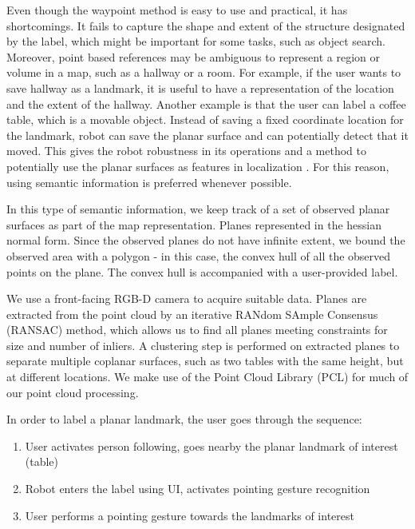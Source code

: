 Even though the waypoint method is easy to use and practical, it has shortcomings. It fails to capture the shape and extent of the structure designated by the label, which might be important for some tasks, such as object search. Moreover, point based references may be ambiguous to represent a region or volume in a map, such as a hallway or a room. For example, if the user wants to save hallway as a
landmark, it is useful to have a representation of the location
and the extent of the hallway. Another example is that the
user can label a coffee table, which is a movable object.
Instead of saving a fixed coordinate location for the landmark,
robot can save the planar surface and can potentially
detect that it moved. This gives the robot robustness in its operations and a method to potentially use the planar surfaces as features in localization \cite{trevor2012planar}. For this reason, using semantic information is preferred whenever possible.

In this type of semantic information, we keep track of a set of observed planar surfaces as part of the map representation. Planes represented in the hessian normal form. Since the observed planes do not have infinite extent, we bound the observed area with a polygon - in this case, the convex hull of all the observed points on the plane. The convex hull is accompanied with a user-provided label. 

We use a front-facing RGB-D camera to acquire suitable data. Planes are extracted from the point cloud by an iterative RANdom SAmple Consensus (RANSAC) method, which allows us to find all planes meeting constraints for size and number of inliers. A clustering step is performed on extracted planes to separate multiple coplanar surfaces, such as two tables with
the same height, but at different locations. We make use of the Point Cloud Library (PCL) \cite{rusu20113d} for much of our point cloud processing.

In order to label a planar landmark, the user goes through the sequence:

\begin{enumerate}
\item User activates person following, goes nearby the planar landmark of interest (table)
\item Robot enters the label using UI, activates pointing gesture recognition
\item User performs a pointing gesture towards the landmarks of interest
\end{enumerate}

